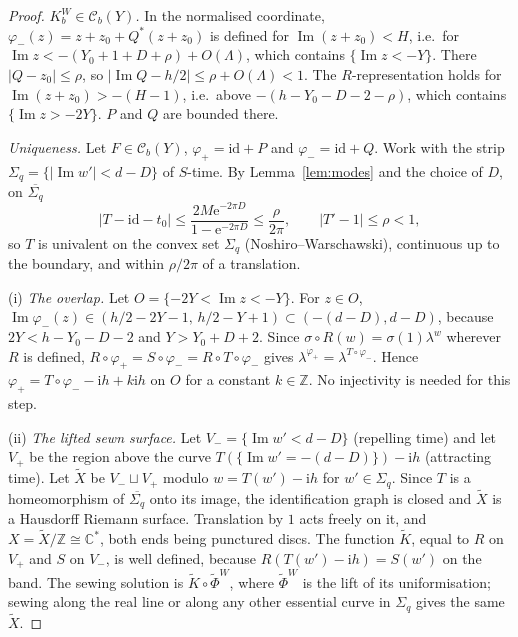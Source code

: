 \documentclass[11pt]{amsart}
\theoremstyle{definition}
\newcommand{\Rr}{R}
\newcommand{\Kk}{K}
\newcommand{\eee}{\mathrm{e}}
\newcommand{\ii}{\mathrm{i}}
\begin{document}
\begin{proof}
\emph{$\Kk^W_b\in\mathcal C_b(Y)$.}  In the normalised coordinate,
$\varphi_-(z)=z+z_0+Q^*(z+z_0)$ is defined for
$\operatorname{Im}(z+z_0)<H$, i.e.\ for $\operatorname{Im}z<-(Y_0+1+D+\rho)+O(\Lambda)$,
which contains $\{\operatorname{Im}z<-Y\}$.  There $|Q-z_0|\le\rho$, so
$|\operatorname{Im}Q-h/2|\le\rho+O(\Lambda)<1$.  The $\Rr$-representation holds
for $\operatorname{Im}(z+z_0)>-(H-1)$, i.e.\ above
$-(h-Y_0-D-2-\rho)$, which contains $\{\operatorname{Im}z>-2Y\}$.  $P$ and $Q$
are bounded there.

\emph{Uniqueness.}  Let $F\in\mathcal C_b(Y)$, $\varphi_+=\mathrm{id}+P$ and
$\varphi_-=\mathrm{id}+Q$.  Work with the strip
$\Sigma_q=\{|\operatorname{Im}w'|<d-D\}$ of $S$-time.  By Lemma~\ref{lem:modes} and
the choice of $D$, on $\overline{\Sigma_q}$
\[
 |T-\mathrm{id}-t_0|\le\frac{2M\eee^{-2\pi D}}{1-\eee^{-2\pi D}}\le\frac{\rho}{2\pi},\qquad
 |T'-1|\le\rho<1 ,
\]
so $T$ is univalent on the convex set $\Sigma_q$ (Noshiro--Warschawski),
continuous up to the boundary, and within $\rho/2\pi$ of a translation.

(i) \emph{The overlap.}  Let $O=\{-2Y<\operatorname{Im}z<-Y\}$.  For $z\in O$,
$\operatorname{Im}\varphi_-(z)\in(h/2-2Y-1,\,h/2-Y+1)\subset(-(d-D),d-D)$,
because $2Y<h-Y_0-D-2$ and $Y>Y_0+D+2$.  Since
$\sigma\circ\Rr(w)=\sigma(1)\lambda^w$ wherever $\Rr$ is defined,
$\Rr\circ\varphi_+=S\circ\varphi_-=\Rr\circ T\circ\varphi_-$ gives
$\lambda^{\varphi_+}=\lambda^{T\circ\varphi_-}$.  Hence
$\varphi_+=T\circ\varphi_--\ii h+k\ii h$ on $O$ for a constant $k\in\mathbb Z$.
No injectivity is needed for this step.

(ii) \emph{The lifted sewn surface.}  Let $V_-=\{\operatorname{Im}w'<d-D\}$
(repelling time) and let $V_+$ be the region above the curve
$T(\{\operatorname{Im}w'=-(d-D)\})-\ii h$ (attracting time).  Let $\tilde X$ be
$V_-\sqcup V_+$ modulo $w=T(w')-\ii h$ for $w'\in\Sigma_q$.  Since $T$ is a
homeomorphism of $\overline{\Sigma_q}$ onto its image, the identification
graph is closed and $\tilde X$ is a Hausdorff Riemann surface.  Translation by
$1$ acts freely on it, and $X=\tilde X/\mathbb Z\cong\mathbb C^*$, both ends
being punctured discs.  The function $\tilde K$, equal to $\Rr$ on $V_+$ and
$S$ on $V_-$, is well defined, because $\Rr(T(w')-\ii h)=S(w')$ on the band.
The sewing solution is $\tilde K\circ\tilde\Phi^W$, where $\tilde\Phi^W$ is the
lift of its uniformisation; sewing along the real line or along any other
essential curve in $\Sigma_q$ gives the same $\tilde X$.


\end{proof}
\end{document}
